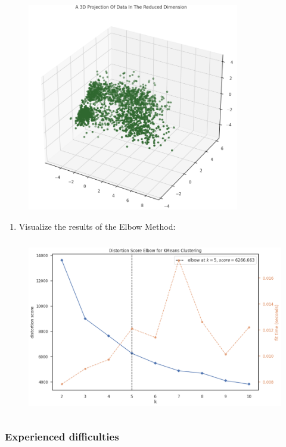 \documentclass[11pt]{article}
\begin{document}
\vspace{1\baselineskip}
\begin{figure}[H]
\centering
\includegraphics[width=9.26cm,height=9.11cm]{./images/image36.png}
\end{figure}


\vspace{1\baselineskip}
\begin{enumerate}
	\item Visualize the results of the Elbow Method:

\end{enumerate}
\vspace{1\baselineskip}
\begin{figure}[H]
\centering
\includegraphics[width=12.21cm,height=7.66cm]{./images/image24.png}
\end{figure}


\vspace{1\baselineskip}
\subsubsection{Experienced difficulties}
\end{document}
